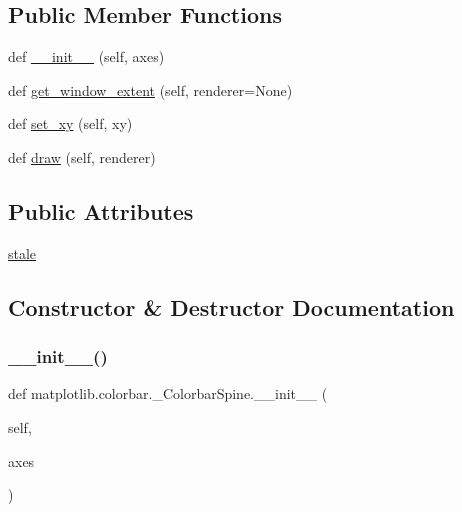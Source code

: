 \subsection*{Public Member Functions}
\begin{DoxyCompactItemize}
\item 
def \hyperlink{classmatplotlib_1_1colorbar_1_1__ColorbarSpine_a116abf86aa1d23b065f9d7abe67505bc}{\+\_\+\+\_\+init\+\_\+\+\_\+} (self, axes)
\item 
def \hyperlink{classmatplotlib_1_1colorbar_1_1__ColorbarSpine_a095faeffe8a075f842650bf43234be7f}{get\+\_\+window\+\_\+extent} (self, renderer=None)
\item 
def \hyperlink{classmatplotlib_1_1colorbar_1_1__ColorbarSpine_a5120fdc72adc072e56ad24d1e658f083}{set\+\_\+xy} (self, xy)
\item 
def \hyperlink{classmatplotlib_1_1colorbar_1_1__ColorbarSpine_a2c3c339b715086d6b974d5206cf547b4}{draw} (self, renderer)
\end{DoxyCompactItemize}
\subsection*{Public Attributes}
\begin{DoxyCompactItemize}
\item 
\hyperlink{classmatplotlib_1_1colorbar_1_1__ColorbarSpine_a9bc8a180a0fd2545e8230673fe1344d3}{stale}
\end{DoxyCompactItemize}


\subsection{Constructor \& Destructor Documentation}
\mbox{\label{classmatplotlib_1_1colorbar_1_1__ColorbarSpine_a116abf86aa1d23b065f9d7abe67505bc}} 
\subsubsection{\texorpdfstring{\+\_\+\+\_\+init\+\_\+\+\_\+()}{\_\_init\_\_()}}
{\footnotesize\ttfamily def matplotlib.\+colorbar.\+\_\+\+Colorbar\+Spine.\+\_\+\+\_\+init\+\_\+\+\_\+ (\begin{DoxyParamCaption}\item[{}]{self,  }\item[{}]{axes }\end{DoxyParamCaption})}



